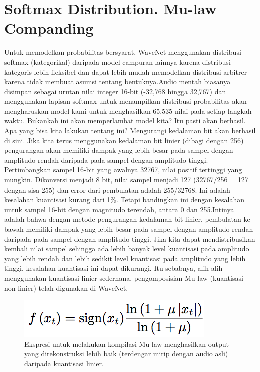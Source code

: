 \section{Softmax Distribution. Mu-law Companding}
Untuk memodelkan probabilitas bersyarat, WaveNet menggunakan distribusi softmax (kategorikal) daripada model campuran lainnya karena distribusi kategoris lebih fleksibel dan dapat lebih mudah memodelkan distribusi arbitrer karena tidak membuat asumsi tentang bentuknya.Audio mentah biasanya disimpan sebagai urutan nilai integer 16-bit (-32,768 hingga 32,767) dan menggunakan lapisan softmax untuk menampilkan distribusi probabilitas akan mengharuskan model kami untuk menghasilkan 65.535 nilai pada setiap langkah waktu. Bukankah ini akan memperlambat model kita? Itu pasti akan berhasil. Apa yang bisa kita lakukan tentang ini? Mengurangi kedalaman bit akan berhasil di sini. Jika kita terus menggunakan kedalaman bit linier (dibagi dengan 256) pengurangan akan memiliki dampak yang lebih besar pada sampel dengan amplitudo rendah daripada pada sampel dengan amplitudo tinggi. Pertimbangkan sampel 16-bit yang awalnya 32767, nilai positif tertinggi yang mungkin. Dikonversi menjadi 8 bit, nilai sampel menjadi 127 (32767/256 = 127 dengan sisa 255) dan error dari pembulatan adalah 255/32768. Ini adalah kesalahan kuantisasi kurang dari 1\%. Tetapi bandingkan ini dengan kesalahan untuk sampel 16-bit dengan magnitudo terendah, antara 0 dan 255.Intinya adalah bahwa dengan metode pengurangan kedalaman bit linier, pembulatan ke bawah memiliki dampak yang lebih besar pada sampel dengan amplitudo rendah daripada pada sampel dengan amplitudo tinggi. Jika kita dapat mendistribusikan kembali nilai sampel sehingga ada lebih banyak level kuantisasi pada amplitudo yang lebih rendah dan lebih sedikit level kuantisasi pada amplitudo yang lebih tinggi, kesalahan kuantisasi ini dapat dikurangi. Itu sebabnya, alih-alih menggunakan kuantisasi linier sederhana, pengomposisian Mu-law (kuantisasi non-linier) telah digunakan di WaveNet.

\begin{figure}[H]
        \centerline{\includegraphics[scale=.5]{figures/rumus4}}
        \caption{Ekspresi untuk melakukan kompilasi Mu-law menghasilkan output yang direkonstruksi lebih baik (terdengar mirip dengan audio asli) daripada kuantisasi linier.}
		\label{rumus4}
\end{figure}

